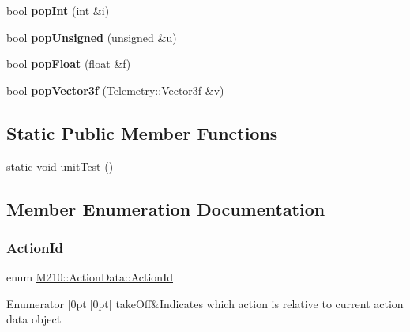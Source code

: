 \begin{DoxyCompactItemize}
bool {\bfseries pop\+Int} (int \&i)
\item 
\mbox{\label{class_m210_1_1_action_data_a8e215d39d3057afeec1d4b7776066182}} 
bool {\bfseries pop\+Unsigned} (unsigned \&u)
\item 
\mbox{\label{class_m210_1_1_action_data_a6a280037c2241d17e53e05d1fa114b30}} 
bool {\bfseries pop\+Float} (float \&f)
\item 
\mbox{\label{class_m210_1_1_action_data_a0606072003289b2a504e2f9d450bac60}} 
bool {\bfseries pop\+Vector3f} (Telemetry\+::\+Vector3f \&v)
\end{DoxyCompactItemize}
\subsection*{Static Public Member Functions}
\begin{DoxyCompactItemize}
\item 
static void \mbox{\hyperlink{class_m210_1_1_action_data_acf9043b5b953a5a0c837ae679c9ab0e5}{unit\+Test}} ()
\end{DoxyCompactItemize}


\subsection{Member Enumeration Documentation}
\mbox{\label{class_m210_1_1_action_data_a35cd47f396d015ad523e845ddfaeab4c}} 
\subsubsection{\texorpdfstring{Action\+Id}{ActionId}}
{\footnotesize\ttfamily enum \mbox{\hyperlink{class_m210_1_1_action_data_a35cd47f396d015ad523e845ddfaeab4c}{M210\+::\+Action\+Data\+::\+Action\+Id}}}

\begin{DoxyEnumFields}{Enumerator}
[0pt][0pt]{}\mbox{\label{class_m210_1_1_action_data_a35cd47f396d015ad523e845ddfaeab4ca2db55758ab72814e1383f5930fe6634a}} 
take\+Off&Indicates which action is relative to current action data object \\
\hline

\end{DoxyEnumFields}


